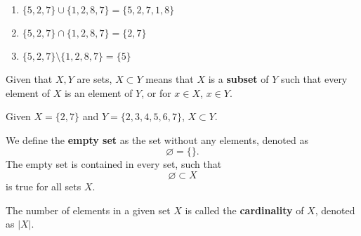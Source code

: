 \begin{example}
    \begin{enumerate}
        \item $\{5,2,7\}\cup\{1,2,8,7\}=\{5,2,7,1,8\}$
        \item $\{5,2,7\}\cap\{1,2,8,7\}=\{2,7\}$
        \item $\{5,2,7\}\setminus\{1,2,8,7\}=\{5\}$
    \end{enumerate}
\end{example}

\begin{definition}
    Given that $X,Y$ are sets, $X\subset Y$ means that $X$ is a \textbf{subset} of $Y$ such that every element of $X$ is an element of $Y$, or for $x\in X$, $x\in Y$.
\end{definition}

\begin{example}
    Given $X = \{ 2, 7 \}$ and $Y = \{ 2, 3, 4, 5, 6, 7 \}$, $X\subset Y$.
\end{example}

\begin{definition}
    We define the \textbf{empty set} as the set without any elements, denoted as
    \[\varnothing=\{\}.\]
    The empty set is contained in every set, such that
    \[\varnothing\subset X\]
    is true for all sets $X$.
\end{definition}

\begin{definition}
    The number of elements in a given set $X$ is called the \textbf{cardinality} of $X$, denoted as $|X|$.
\end{definition}

